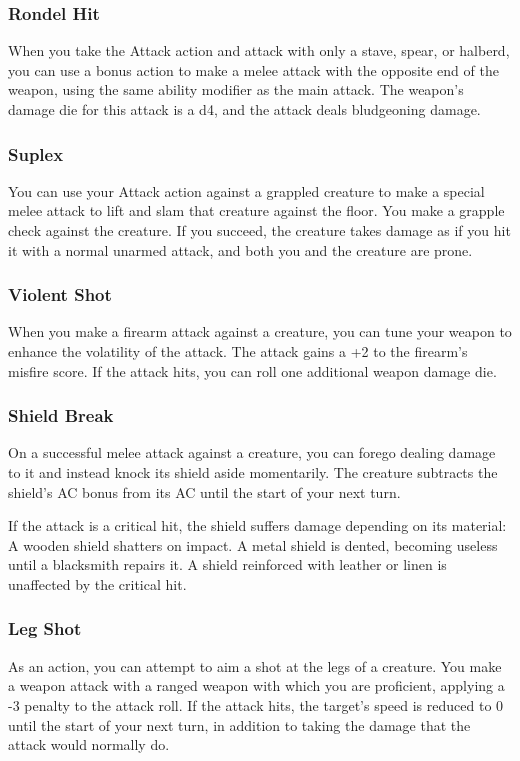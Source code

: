 \subsubsection{Rondel Hit} \label{tec::rondelhit}
When you take the Attack action and attack with only a stave, spear, or halberd, you can use a bonus action to make a melee attack with the opposite end of the weapon, using the same ability modifier as the main attack.
The weapon's damage die for this attack is a d4, and the attack deals bludgeoning damage.

\subsubsection{Suplex} \label{tec::suplex}
You can use your Attack action against a grappled creature to make a special melee attack to lift and slam that creature against the floor.
You make a grapple check against the creature.
If you succeed, the creature takes damage as if you hit it with a normal unarmed attack, and both you and the creature are prone.

\subsubsection{Violent Shot} \label{tec::violentshot}
When you make a firearm attack against a creature, you can tune your weapon to enhance the volatility of the attack.
The attack gains a +2 to the firearm's misfire score.
If the attack hits, you can roll one additional weapon damage die.

\subsubsection{Shield Break} \label{tec::shieldbreak}
On a successful melee attack against a creature, you can forego dealing damage to it and instead knock its shield aside momentarily.
The creature subtracts the shield's AC bonus from its AC until the start of your next turn.

If the attack is a critical hit, the shield suffers damage depending on its material:
A wooden shield shatters on impact.
A metal shield is dented, becoming useless until a blacksmith repairs it.
A shield reinforced with leather or linen is unaffected by the critical hit.

\subsubsection{Leg Shot} \label{tec::legshot}
As an action, you can attempt to aim a shot at the legs of a creature.
You make a weapon attack with a ranged weapon with which you are proficient, applying a -3 penalty to the attack roll.
If the attack hits, the target's speed is reduced to 0 until the start of your next turn, in addition to taking the damage that the attack would normally do.

